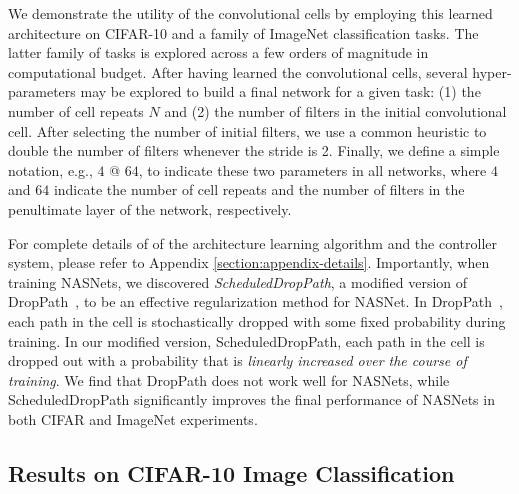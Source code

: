 We demonstrate the utility of the convolutional cells by employing this learned architecture on CIFAR-10 and a family of ImageNet classification tasks. The latter family of tasks is explored across a few orders of magnitude in computational budget.
After having learned the convolutional cells, several hyper-parameters may be explored to build a final network for a given task: (1) the number of cell repeats $N$ and (2) the number of filters in the initial convolutional cell. After selecting the number of initial filters, we use a common heuristic to double the number of filters whenever the stride is 2.
Finally, we define a simple notation, e.g.,  $4$ @ $64$, to indicate these two parameters in all networks, where $4$ and $64$ indicate the number of cell repeats and the number of filters in the penultimate layer of the network, respectively.

For complete details of of the architecture learning algorithm and the controller system, please refer to  Appendix \ref{section:appendix-details}. Importantly, when training NASNets, we discovered \emph{ScheduledDropPath}, a modified version of DropPath~\cite{larsson2016fractalnet}, to be an effective regularization method for NASNet. In DropPath~\cite{larsson2016fractalnet}, each path in the cell is stochastically dropped with some fixed probability during training.  In our modified version, ScheduledDropPath, each path in the cell is dropped out with a probability that is \emph{linearly increased over the course of training}. We find that DropPath does not work well for NASNets, while ScheduledDropPath  significantly improves the final performance of NASNets in both CIFAR and ImageNet experiments.

\subsection{Results on CIFAR-10 Image Classification}




